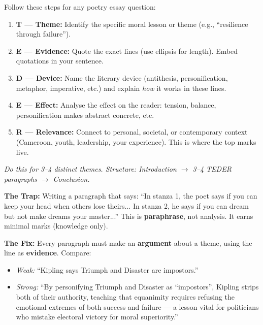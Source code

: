 \documentclass[11pt]{article}
\newcounter{popsec}
\newcounter{popsub}
\newcommand{\courssub}[1]{%
  \stepcounter{popsub}%
  \par\vspace{9pt}\noindent{\popxbold\fontsize{11.5}{13}\selectfont\color{popink}{\color{poporange}\thepopsec.\thepopsub}\hspace{6pt}#1}\par\nopagebreak\vspace{4pt}
}
\begin{document}
\begin{methode}
Follow these steps for any poetry essay question:
\begin{enumerate}
\item \textbf{T — Theme:} Identify the specific moral lesson or theme (e.g., ``resilience through failure'').
\item \textbf{E — Evidence:} Quote the exact lines (use ellipsis for length). Embed quotations in your sentence.
\item \textbf{D — Device:} Name the literary device (antithesis, personification, metaphor, imperative, etc.) and explain \emph{how} it works in these lines.
\item \textbf{E — Effect:} Analyse the effect on the reader: tension, balance, personification makes abstract concrete, etc.
\item \textbf{R — Relevance:} Connect to personal, societal, or contemporary context (Cameroon, youth, leadership, your experience). This is where the top marks live.
\end{enumerate}
\emph{Do this for 3–4 distinct themes. Structure: Introduction $\rightarrow$ 3–4 TEDER paragraphs $\rightarrow$ Conclusion.}
\end{methode}

\begin{attention}
\textbf{The Trap:} Writing a paragraph that says: ``In stanza 1, the poet says if you can keep your head when others lose theirs... In stanza 2, he says if you can dream but not make dreams your master...'' This is \textbf{paraphrase}, not analysis. It earns minimal marks (knowledge only).

\textbf{The Fix:} Every paragraph must make an \textbf{argument} about a theme, using the line as \textbf{evidence}. Compare:
\begin{itemize}
\item \emph{Weak:} ``Kipling says Triumph and Disaster are impostors.''
\item \emph{Strong:} ``By personifying Triumph and Disaster as ``impostors'', Kipling strips both of their authority, teaching that equanimity requires refusing the emotional extremes of both success and failure — a lesson vital for politicians who mistake electoral victory for moral superiority.''
\end{itemize}
\end{attention}

\courssub{Consolidation Exercise}
\end{document}
